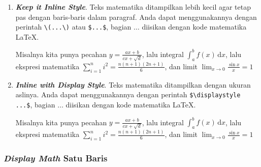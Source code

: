 \begin{enumerate}[label=\alph*.]
    \item \textbf{\textit{Keep it Inline Style}}. Teks matematika ditampilkan lebih kecil agar tetap pas dengan baris-baris dalam paragraf. Anda dapat menggunakannya dengan perintah \verb|\(...\)| atau \verb|$...$|, bagian $\dots$ diisikan dengan kode matematika \LaTeX.
    
    Misalnya kita punya pecahan $y = \frac{ax + b}{cx + \sqrt{d}}$, lalu integral $\int_{a}^{b} f(x) \,\mathrm{d}x$, lalu ekspresi matematika $\sum_{i=1}^{n} i^2 = \frac{n(n+1)(2n+1)}{6}$, dan limit $\lim_{x \to 0} \frac{\sin x}{x} = 1$
    
    \item \textbf{\textit{Inline with Display Style}}. Teks matematika ditampilkan dengan ukuran aslinya. Anda dapat menggunakannya dengan perintah \verb|$\displaystyle ...$|, bagian $\dots$ diisikan dengan kode matematika \LaTeX.
    
    Misalnya kita punya pecahan $\displaystyle y = \frac{ax + b}{cx + \sqrt{d}}$, lalu integral $\displaystyle \int_{a}^{b} f(x) \,\mathrm{d}x$, lalu ekspresi matematika $\displaystyle \sum_{i=1}^{n} i^2 = \frac{n(n+1)(2n+1)}{6}$, dan limit $\displaystyle \lim_{x \to 0} \frac{\sin x}{x} = 1$
\end{enumerate}

\subsubsection{\textit{Display Math} Satu Baris}

